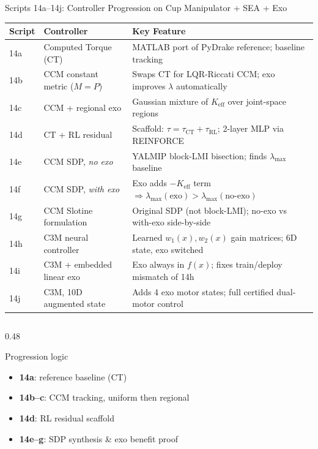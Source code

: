 \documentclass[10pt,aspectratio=169]{beamer}
\begin{document}
\begin{frame}{Scripts 14a–14j: Controller Progression on Cup Manipulator + SEA + Exo}
\vspace{-0.15cm}
{\small
\begin{tabular}{@{}lll@{}}
\toprule
\textbf{Script} & \textbf{Controller} & \textbf{Key Feature} \\
\midrule
14a & Computed Torque (CT) & MATLAB port of PyDrake reference; baseline tracking \\
14b & CCM constant metric ($M{=}P$) & Swaps CT for LQR-Riccati CCM; exo improves $\lambda$ automatically \\
14c & CCM + regional exo & Gaussian mixture of $K_{\mathrm{eff}}$ over joint-space regions \\
14d & CT + RL residual & Scaffold: $\tau{=}\tau_{\text{CT}}+\tau_{\text{RL}}$; 2-layer MLP via REINFORCE \\
14e & CCM SDP, \emph{no exo} & YALMIP block-LMI bisection; finds $\lambda_{\max}$ baseline \\
14f & CCM SDP, \emph{with exo} & Exo adds $-K_{\text{eff}}$ term $\Rightarrow \lambda_{\max}(\text{exo})>\lambda_{\max}(\text{no-exo})$ \\
14g & CCM Slotine formulation & Original SDP (not block-LMI); no-exo vs with-exo side-by-side \\
14h & C3M neural controller & Learned $w_1(x),w_2(x)$ gain matrices; 6D state, exo switched \\
14i & C3M + embedded linear exo & Exo always in $f(x)$; fixes train/deploy mismatch of 14h \\
14j & C3M, 10D augmented state & Adds 4 exo motor states; full certified dual-motor control \\
\bottomrule
\end{tabular}
}
\vspace{0.2cm}
\begin{columns}[T,onlytextwidth]
\begin{column}{0.48\textwidth}
\begin{block}{Progression logic}
\begin{itemize}
    \item \textbf{14a}: reference baseline (CT)
    \item \textbf{14b–c}: CCM tracking, uniform then regional
    \item \textbf{14d}: RL residual scaffold
    \item \textbf{14e–g}: SDP synthesis \& exo benefit proof

\end{itemize}
\end{block}
\end{column}
\end{columns}
\end{frame}
\end{document}
